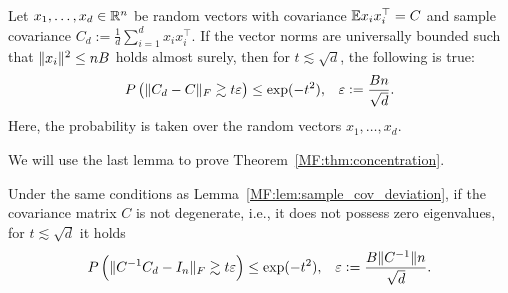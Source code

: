 \begin{lemma}\label{MF:lem:sample_cov_deviation}
Let $x_1,\dots,x_d\in \mathbb{R}^n$ be \iid random vectors with covariance $\mathbb{E} x_i x_i^\top = C$ and sample covariance $C_d:=\frac1d \sum_{i=1}^d x_i x_i^\top.$ If the vector norms are universally bounded such that $\lVert x_i\rVert^2\le n {B}  $ holds almost surely, then for $t \lesssim \sqrt{d}$, the following is true:
\begin{align}
P\left(\|C_d - C\|_F \gtrsim t {\varepsilon} \right) \leq \exp(-t^2), && {\varepsilon}:=\frac{B n}{\sqrt{d}}.
\end{align}
Here, the probability is taken over the random vectors $x_1,\dots,x_d.$
\end{lemma}

We will use the last lemma to prove Theorem~\ref{MF:thm:concentration}.

\begin{lemma}\label{MF:lem:sample_cov_inv_deviation}
Under the same conditions as Lemma~\ref{MF:lem:sample_cov_deviation}, if the covariance matrix $C$ is not degenerate, i.e., it does not possess zero eigenvalues, for $t \lesssim \sqrt{d}$ it holds
\begin{align}
P\left(\|C^{-1} C_d - I_n\|_F \gtrsim t {\varepsilon} \right) \leq \exp(-t^2), && {\varepsilon}:=\frac{B\lVert C^{-1}\rVert n}{\sqrt{d}}.
\end{align}
\end{lemma}

